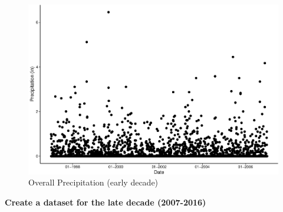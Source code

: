 \documentclass[
  12pt,
]{article}
\begin{document}
\begin{figure}
\centering
\includegraphics{Final_Project_Thornton_Katayama_Ngenzi_files/figure-latex/early plot 2-1.pdf}
\caption{Overall Precipitation (early decade)}
\end{figure}

\textbf{Create a dataset for the late decade (2007-2016)}
\end{document}
